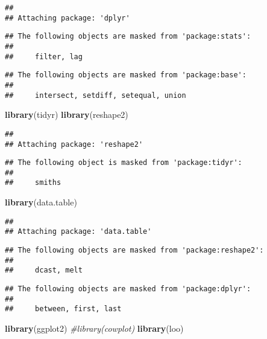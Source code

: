 \documentclass[]{article}
\newenvironment{Shaded}{\begin{snugshade}}{\end{snugshade}}
\newcommand{\KeywordTok}[1]{\textcolor[rgb]{0.13,0.29,0.53}{\textbf{#1}}}
\newcommand{\CommentTok}[1]{\textcolor[rgb]{0.56,0.35,0.01}{\textit{#1}}}
\newcommand{\NormalTok}[1]{#1}
\begin{document}
\begin{verbatim}
## 
## Attaching package: 'dplyr'
\end{verbatim}

\begin{verbatim}
## The following objects are masked from 'package:stats':
## 
##     filter, lag
\end{verbatim}

\begin{verbatim}
## The following objects are masked from 'package:base':
## 
##     intersect, setdiff, setequal, union
\end{verbatim}

\begin{Shaded}
\begin{Highlighting}[]
\KeywordTok{library}\NormalTok{(tidyr)}
\KeywordTok{library}\NormalTok{(reshape2)}
\end{Highlighting}
\end{Shaded}

\begin{verbatim}
## 
## Attaching package: 'reshape2'
\end{verbatim}

\begin{verbatim}
## The following object is masked from 'package:tidyr':
## 
##     smiths
\end{verbatim}

\begin{Shaded}
\begin{Highlighting}[]
\KeywordTok{library}\NormalTok{(data.table)}
\end{Highlighting}
\end{Shaded}

\begin{verbatim}
## 
## Attaching package: 'data.table'
\end{verbatim}

\begin{verbatim}
## The following objects are masked from 'package:reshape2':
## 
##     dcast, melt
\end{verbatim}

\begin{verbatim}
## The following objects are masked from 'package:dplyr':
## 
##     between, first, last
\end{verbatim}

\begin{Shaded}
\begin{Highlighting}[]
\KeywordTok{library}\NormalTok{(ggplot2)}
\CommentTok{#library(cowplot) }
\KeywordTok{library}\NormalTok{(loo)}
\end{Highlighting}
\end{Shaded}
\end{document}
